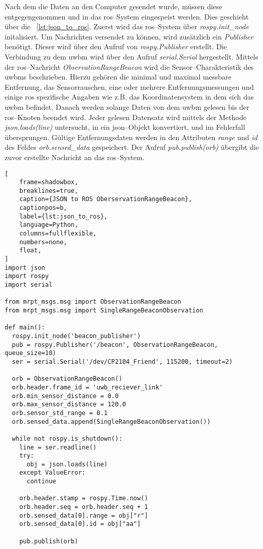 Nach dem die Daten an den Computer gesendet wurde, müssen diese entgegengenommen und in das \Gls{ros}--System eingespeist werden. Dies geschieht über die \lstlistingname~\ref{lst:json_to_ros}.
Zuerst wird das \Gls{ros}--System über \textit{rospy.init\_node} initalisiert. Um Nachrichten versendet zu können, wird zusätzlich ein \textit{Publisher} benötigt. Dieser wird über den Aufruf von \textit{rospy.Publisher} erstellt. Die Verbindung zu dem \Gls{uwbm} wird über den Aufruf \textit{serial.Serial} hergestellt.
Mittels der \Gls{ros}--Nachricht \textit{ObservationRangeBeacon} wird die Sensor--Charakteristik des \Gls{uwbm}s beschrieben. Hierzu gehören die minimal und maximal messbare Entfernung, das Sensorrauschen, eine oder mehrere Entfernungsmessungen und einige \Gls{ros} spezifische Angaben wie z.B. das Koordinatensystem in dem sich das \Gls{uwbm} befindet.
Danach werden solange Daten von dem \Gls{uwbm} gelesen bis der \Gls{ros}--Knoten beendet wird. Jeder gelesen Datensatz wird mittels der Methode \textit{json.loads(line)} untersucht, in ein \Gls{json}--Objekt konvertiert, und im Fehlerfall übersprungen. Gültige Entfernungsdaten werden in den Attributen \textit{range} und \textit{id} des Feldes \textit{orb.sensed\_data} gespeichert.
Der Aufruf \textit{pub.publish(orb)} übergibt die zuvor erstellte Nachricht an das \Gls{ros}--System.

\begin{lstlisting}[
	frame=shadowbox,
	breaklines=true,
	caption={JSON to ROS OberservationRangeBeacon},
	captionpos=b,
	label={lst:json_to_ros},
	language=Python,
	columns=fullflexible,
	numbers=none,
	float,
]
import json
import rospy
import serial

from mrpt_msgs.msg import ObservationRangeBeacon
from mrpt_msgs.msg import SingleRangeBeaconObservation

def main():
  rospy.init_node('beacon_publisher')
  pub = rospy.Publisher('/beacon', ObservationRangeBeacon, queue_size=10)
  ser = serial.Serial('/dev/CP2104_Friend', 115200, timeout=2)

  orb = ObservationRangeBeacon()
  orb.header.frame_id = 'uwb_reciever_link'
  orb.min_sensor_distance = 0.0
  orb.max_sensor_distance = 120.0
  orb.sensor_std_range = 0.1
  orb.sensed_data.append(SingleRangeBeaconObservation())

  while not rospy.is_shutdown():
    line = ser.readline()
    try:
      obj = json.loads(line)
    except ValueError:
      continue

    orb.header.stamp = rospy.Time.now()
    orb.header.seq = orb.header.seq + 1
    orb.sensed_data[0].range = obj["r"]
    orb.sensed_data[0].id = obj["aa"]

    pub.publish(orb)
\end{lstlisting}



